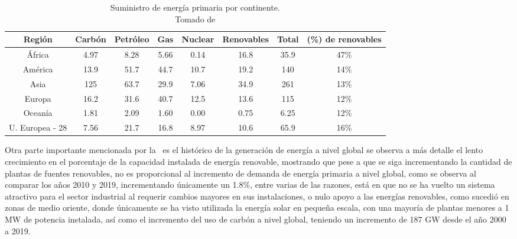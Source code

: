 \begin{table}[H]
    \centering
    \caption{Suministro de energía primaria por continente. \\ Tomado de \protect\textcite{wba2021}}
    \label{tab:biomasa21}

    \begin{tabular}{cccccccc}
        \hline
        Región          & Carbón & Petróleo & Gas  & Nuclear & Renovables & Total & (\%) de renovables \\
        \hline
        África          & 4.97   & 8.28     & 5.66 & 0.14    & 16.8       & 35.9  & 47\%               \\
        América         & 13.9   & 51.7     & 44.7 & 10.7    & 19.2       & 140   & 14\%               \\
        Asia            & 125    & 63.7     & 29.9 & 7.06    & 34.9       & 261   & 13\%               \\
        Europa          & 16.2   & 31.6     & 40.7 & 12.5    & 13.6       & 115   & 12\%               \\
        Oceanía         & 1.81   & 2.09     & 1.60 & 0.00    & 0.75       & 6.25  & 12\%               \\
        U. Europea - 28 & 7.56   & 21.7     & 16.8 & 8.97    & 10.6       & 65.9  & 16\%               \\
        \hline
    \end{tabular}
\end{table}

Otra parte importante mencionada por la~\textcite{wba2021} es el histórico de la generación de energía a nivel global se observa a más detalle el lento crecimiento en el porcentaje de la capacidad instalada de energía renovable, mostrando que pese a que se siga incrementando la cantidad de plantas de fuentes renovables, no es proporcional al incremento de demanda de energía primaria a nivel global, como se observa al comparar los años 2010 y 2019, incrementando únicamente un 1.8\%, entre varias de las razones, está en que no se ha vuelto un sistema atractivo para el sector industrial al requerir cambios mayores en sus instalaciones, o nulo apoyo a las energías renovables, como sucedió en zonas de medio oriente, donde únicamente se ha visto utilizada la energía solar en pequeña escala, con una mayoría de plantas menores a 1 MW de potencia instalada, así como el incremento del uso de carbón a nivel global, teniendo un incremento de 187 GW desde el año 2000 a 2019.

